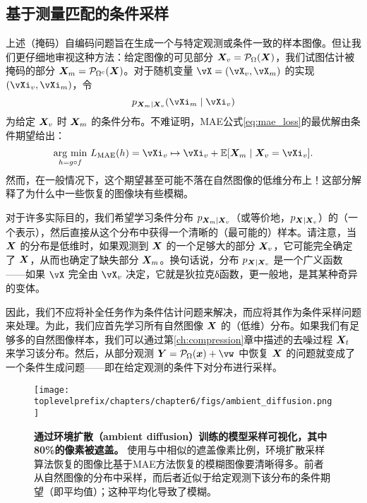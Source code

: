 \documentclass[../../book-main.tex]{subfiles}
\begin{document}
\subsection{基于测量匹配的条件采样}
\label{sec:conditioned-decoding}
上述（掩码）自编码问题旨在生成一个与特定观测或条件一致的样本图像。但让我们更仔细地审视这种方法：给定图像的可见部分 $\bm{X}_v = \mathcal{P}_{\Omega}(\bm{X})$，我们试图估计被掩码的部分 $\bm{X}_m = \mathcal{P}_{\Omega^c}(\bm{X})$。对于随机变量 $\vX=(\vX_v, \vX_m)$ 的实现 $(\vXi_v, \vXi_m)$，令
\[p_{\X_m \mid \X_v}(\vXi_m\mid \vXi_v)\]
为给定 $\bm{X}_v$ 时 $\bm{X}_m$ 的条件分布。不难证明，MAE公式\eqref{eq:mae_loss}的最优解由条件期望给出：
\begin{equation}
  \argmin_{h = g \circ f}\, L_{\mathrm{MAE}}(h)
  = \vXi_v \mapsto \vXi_v + \mathbb{E}[\X_m \mid \X_v=\vXi_v].
\end{equation}
然而，在一般情况下，这个期望甚至可能不落在自然图像的低维分布上！这部分解释了为什么中一些恢复的图像块有些模糊。

对于许多实际目的，我们希望学习条件分布 $p_{\bm{X}_m \mid \bm{X}_v}$（或等价地，$p_{\bm{X} \mid \bm{X}_v}$）的（一个表示），然后直接从这个分布中获得一个清晰的（最可能的）样本。请注意，当 $\bm{X}$ 的分布是低维时，如果观测到 $\bm{X}$ 的一个足够大的部分 $\bm{X}_v$，它可能完全确定了 $\bm{X}$，从而也确定了缺失部分 $\bm{X}_m$。换句话说，分布 $p_{\bm{X} \mid \bm{X}_v}$ 是一个广义函数——如果 $\vX$ 完全由 $\vX_v$ 决定，它就是狄拉克δ函数，更一般地，是其某种奇异的变体。

因此，我们不应将补全任务作为条件估计问题来解决，而应将其作为条件采样问题来处理。为此，我们应首先学习所有自然图像 $\bm{X}$ 的（低维）分布。如果我们有足够多的自然图像样本，我们可以通过第\ref{ch:compression}章中描述的去噪过程 $\bm{X}_t$ 来学习该分布。然后，从部分观测 $\Y = \mathcal{P}_\Omega(\x) +\vw$ 中恢复 $\bm{X}$ 的问题就变成了一个条件生成问题——即在给定观测的条件下对分布进行采样。

\begin{figure}
  \centering
  \texttt{[image: \\toplevelprefix/chapters/chapter6/figs/ambient\_diffusion.png]}
  \caption{\small \textbf{通过环境扩散（ambient diffusion）\cite{Daras-NIPS2023}训练的模型采样可视化，其中80\%的像素被遮盖。} 使用与中相似的遮盖像素比例，环境扩散采样算法恢复的图像比基于MAE方法恢复的模糊图像要清晰得多。前者从自然图像的分布中采样，而后者近似于给定观测下该分布的条件期望（即平均值）；这种平均化导致了模糊。}
  \label{fig:ambient_diffusion}
\end{figure}
\end{document}
